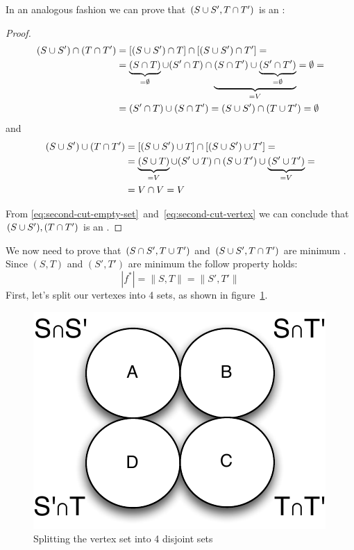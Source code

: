In an analogous fashion we can prove that $(S \cup S', T \cap T')$ is an \stcut{}:
\begin{proof}
\begin{align}
(S \cup S') \cap (T \cap T') &= [(S \cup S') \cap T] \cap [(S \cup S') \cap T'] = \nonumber \\ 
&= \underbrace{(S \cap T)}_{=\emptyset} \cup (S' \cap T) \cap \underbrace{(S \cap T') \cup \underbrace{(S' \cap T')}_{=\emptyset}}_{=V} = \emptyset = \nonumber \\
&= (S' \cap T) \cup (S \cap T') = (S \cup S') \cap (T \cup T') = \emptyset \label{eq:second-cut-empty-set}
\end{align}
and
\begin{align}
(S \cup S') \cup (T \cap T') &= [(S \cup S') \cup T] \cap [(S \cup S') \cup T'] = \nonumber \\
&= \underbrace{(S \cup T)}_{=V} \cup (S' \cup T) \cap (S \cup T') \cup \underbrace{(S' \cup T')}_{=V} = \nonumber \\
&= V \cap V = V \label{eq:second-cut-vertex}
\end{align}

From \eqref{eq:second-cut-empty-set}~and~\eqref{eq:second-cut-vertex} we can conclude that $(S \cup S'), (T \cap T')$ is an \stcut{}.
\end{proof}

We now need to prove that $(S \cap S', T \cup T')$ and $(S \cup S', T \cap T')$ are minimum \stcuts{}.
Since $(S, T)$ and $(S', T')$ are minimum \stcuts{} the follow property holds:
\begin{equation}
| f^{*} | = \| S, T \| = \| S', T' \|
\label{eq:minimum-cuts}
\end{equation}
First, let's split our vertexes into 4 sets, as shown in figure~\ref{fig:problem2}. 

\begin{figure}[h!bt]
	\begin{center}
	\includegraphics{problem2}
	\end{center}
	\caption{Splitting the vertex set into 4 disjoint sets}
	\label{fig:problem2}
\end{figure}

